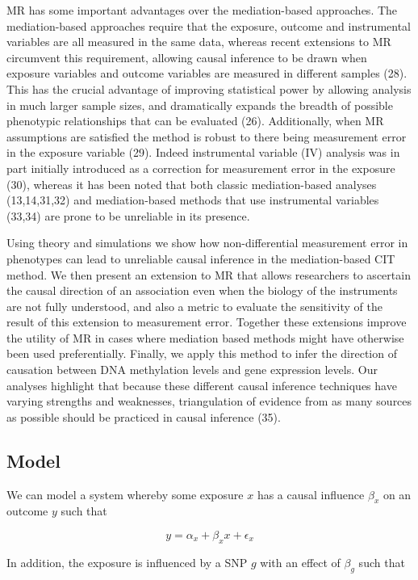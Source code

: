 \documentclass[]{article}
\begin{document}
MR has some important advantages over the mediation-based approaches.
The mediation-based approaches require that the exposure, outcome and
instrumental variables are all measured in the same data, whereas recent
extensions to MR circumvent this requirement, allowing causal inference
to be drawn when exposure variables and outcome variables are measured
in different samples (28). This has the crucial advantage of improving
statistical power by allowing analysis in much larger sample sizes, and
dramatically expands the breadth of possible phenotypic relationships
that can be evaluated (26). Additionally, when MR assumptions are
satisfied the method is robust to there being measurement error in the
exposure variable (29). Indeed instrumental variable (IV) analysis was
in part initially introduced as a correction for measurement error in
the exposure (30), whereas it has been noted that both classic
mediation-based analyses (13,14,31,32) and mediation-based methods that
use instrumental variables (33,34) are prone to be unreliable in its
presence.

Using theory and simulations we show how non-differential measurement
error in phenotypes can lead to unreliable causal inference in the
mediation-based CIT method. We then present an extension to MR that
allows researchers to ascertain the causal direction of an association
even when the biology of the instruments are not fully understood, and
also a metric to evaluate the sensitivity of the result of this
extension to measurement error. Together these extensions improve the
utility of MR in cases where mediation based methods might have
otherwise been used preferentially. Finally, we apply this method to
infer the direction of causation between DNA methylation levels and gene
expression levels. Our analyses highlight that because these different
causal inference techniques have varying strengths and weaknesses,
triangulation of evidence from as many sources as possible should be
practiced in causal inference (35).

\subsection{Model}\label{model}

We can model a system whereby some exposure \(x\) has a causal influence
\(\beta_x\) on an outcome \(y\) such that

\[
y = \alpha_x + \beta_x x + \epsilon_x
\]

In addition, the exposure is influenced by a SNP \(g\) with an effect of
\(\beta_g\) such that
\end{document}
